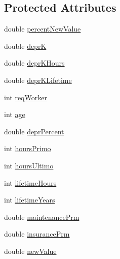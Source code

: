 \subsection*{Protected Attributes}
\begin{DoxyCompactItemize}
\item 
double \hyperlink{classtech_farm_a0baa87da42934d1351ff609caab75d1b}{percentNewValue}
\item 
double \hyperlink{classtech_farm_ab6e2b2da18fe94c6b383e7debd6e24e3}{deprK}
\item 
double \hyperlink{classtech_farm_a8bfead4fd584c3ce436d4ca690063f19}{deprKHours}
\item 
double \hyperlink{classtech_farm_a47efbd2140c6cdfac72124975d020642}{deprKLifetime}
\item 
int \hyperlink{classtech_farm_a3f395d50454e34c3f495fdc53a8ef194}{reqWorker}
\item 
int \hyperlink{classtech_farm_a938e00cc70834f5115fa1fde901a8ca9}{age}
\item 
double \hyperlink{classtech_farm_a74f6c9c28417b9aadebe157496d55313}{deprPercent}
\item 
int \hyperlink{classtech_farm_a7b246e44d0bb53d7a27544dc8f90f894}{hoursPrimo}
\item 
int \hyperlink{classtech_farm_addd00177637ae6a4d7b2b5b17d8165eb}{hoursUltimo}
\item 
int \hyperlink{classtech_farm_af30e2c2e0c28c28cc16805bf4ca58d69}{lifetimeHours}
\item 
int \hyperlink{classtech_farm_a2030e73d2288e2318ae895a7c408beb9}{lifetimeYears}
\item 
double \hyperlink{classtech_farm_a0d7f79586bcb59066cc0590535b28485}{maintenancePrm}
\item 
double \hyperlink{classtech_farm_a9003d90c9e3d01a55480ff9f25f2bdcb}{insurancePrm}
\item 
double \hyperlink{classtech_farm_abd1992a08582622f44ca7ed8fd9072d0}{newValue}
\end{DoxyCompactItemize}


